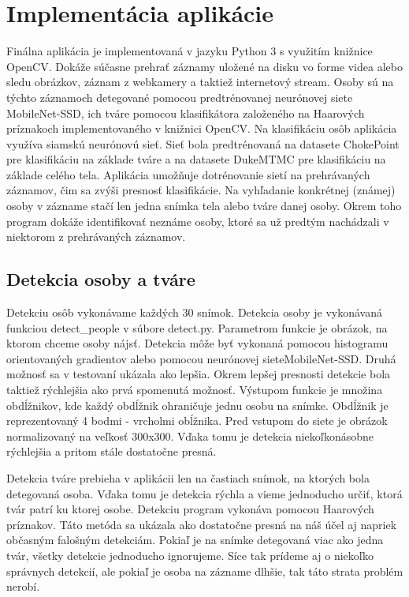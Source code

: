\chapter{Implementácia aplikácie}
\label{kap:implementacia}
Finálna aplikácia je implementovaná v jazyku Python 3 s využitím knižnice OpenCV. 
Dokáže súčasne prehrať záznamy uložené na disku vo forme videa alebo sledu obrázkov, záznam z webkamery a taktiež internetový stream.
Osoby sú na týchto záznamoch detegované pomocou predtrénovanej neurónovej siete MobileNet-SSD, 
ich tváre pomocou klasifikátora založeného na Haarových príznakoch implementovaného v knižnici OpenCV. 
Na klasifikáciu osôb aplikácia využíva siamskú neurónovú sieť. 
Sieť bola predtrénovaná na datasete ChokePoint \cite{wong_cvprw_2011} pre klasifikáciu na základe tváre a na datasete DukeMTMC \cite{ristani2016MTMC} \cite{zheng2017unlabeled} pre klasifikáciu na základe celého tela.
Aplikácia umožňuje dotrénovanie sietí na prehrávaných záznamov, čim sa zvýši presnosť klasifikácie.
Na vyhľadanie konkrétnej (známej) osoby v zázname stačí len jedna snímka tela alebo tváre danej osoby. 
Okrem toho program dokáže identifikovať neznáme osoby, ktoré sa už predtým nachádzali v niektorom z prehrávaných záznamov.

\section{Detekcia osoby a tváre}
Detekciu osôb vykonávame každých 30 snímok. 
Detekcia osoby je vykonávaná funkciou detect\_people v súbore detect.py. Parametrom funkcie je obrázok, na ktorom chceme osoby nájsť.
Detekcia môže byť vykonaná pomocou histogramu orientovaných gradientov alebo pomocou neurónovej sieteMobileNet-SSD.
Druhá možnosť sa v testovaní ukázala ako lepšia. 
Okrem lepšej presnosti detekcie bola taktiež rýchlejšia ako prvá spomenutá možnosť.
Výstupom funkcie je množina obdĺžnikov, kde každý obdĺžnik ohraničuje jednu osobu na snímke. 
Obdĺžnik je reprezentovaný 4 bodmi - vrcholmi obĺžnika.
Pred vstupom do siete je obrázok normalizovaný na veľkosť 300x300. 
Vďaka tomu je detekcia niekoľkonásobne rýchlejšia a pritom stále dostatočne presná.

Detekcia tváre prebieha v aplikácii len na častiach snímok, na ktorých bola detegovaná osoba.
Vďaka tomu je detekcia rýchla a vieme jednoducho určiť, ktorá tvár patrí ku ktorej osobe.
Detekciu program vykonáva pomocou Haarových príznakov. 
Táto metóda sa ukázala ako dostatočne presná na náš účel aj napriek občasným falošným detekciám.
Pokiaľ je na snímke detegovaná viac ako jedna tvár, všetky detekcie jednoducho ignorujeme. 
Síce tak prídeme aj o niekoľko správnych detekcií, ale pokiaľ je osoba na zázname dlhšie, tak táto strata problém nerobí.


